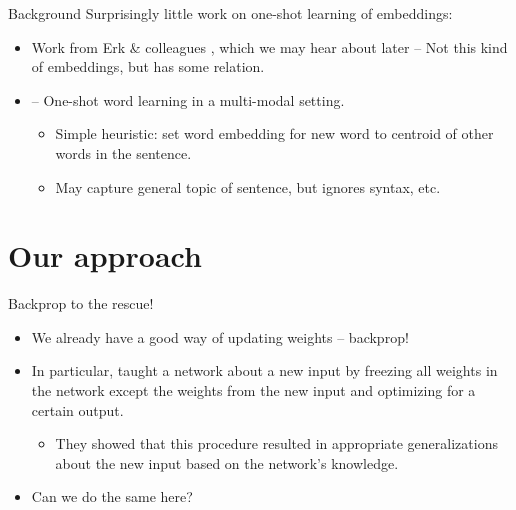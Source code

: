 \documentclass{beamer}
\begin{document}
\begin{frame}
\begin{figure}
\end{figure}
\end{frame}

\begin{frame}{Background}
Surprisingly little work on one-shot learning of embeddings:
\begin{itemize}
    \item<1-> Work from Erk \& colleagues \citep{Wang2017}, which we may hear about later -- Not this kind of embeddings, but has some relation.
    \item<2-> \citet{Lazaridou2017} -- One-shot word learning in a multi-modal setting. 
    \begin{itemize}
	\item<3-> Simple heuristic: set word embedding for new word to centroid of other words in the sentence.
	 \vspace{-10pt}
	\item<5-> May capture general topic of sentence, but ignores syntax, etc.
    \end{itemize}
\end{itemize}
\end{frame}

\section{Our approach}
\begin{frame}{Backprop to the rescue!}
\begin{itemize}
    \item<1-> We already have a good way of updating weights -- backprop!
    \item<2-> In particular, \citet{Rumelhart1993} taught a network about a new input by freezing all weights in the network except the weights from the new input and optimizing for a certain output.
    \begin{itemize}
	\item<3-> They showed that this procedure resulted in appropriate generalizations about the new input based on the network's knowledge.
    \end{itemize} 
    \item<4-> Can we do the same here?
\end{itemize}
\end{frame}
\end{document}
